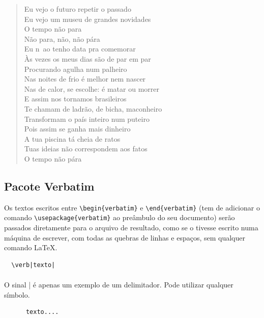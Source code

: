 \documentclass[a4paper,10pt]{report}
\newenvironment{myverbatim}
{\verbatim}
{\endverbatim}
\begin{document}
\begin{verse}
Eu vejo o futuro repetir o passado \\
Eu vejo um museu de grandes novidades \\
O tempo não para \\
Não para, não, não pára \\
Eu n~ao tenho data pra comemorar \\
Às vezes os meus dias são de par em par \\
Procurando agulha num palheiro \\
Nas noites de frio é melhor nem nascer \\
Nas de calor, se escolhe: é matar ou morrer \\
E assim nos tornamos brasileiros \\
Te chamam de ladrão, de bicha, maconheiro \\
Transformam o país inteiro num puteiro \\
Pois assim se ganha mais dinheiro \\
A tua piscina tá cheia de ratos \\
Tuas ideias não correspondem aos fatos \\
O tempo não pára \\
\end{verse}

\subsection{Pacote Verbatim}
Os textos escritos entre \verb|\begin{verbatim}| e \verb|\end{verbatim}| (tem de adicionar o comando \verb|\usepackage{verbatim}| ao preâmbulo do seu documento) serão passados diretamente para o arquivo de resultado, como se o tivesse escrito numa máquina de escrever, com todas as quebras de linhas e espaços, sem qualquer comando \LaTeX{}.
\begin{verbatim}
  \verb|texto|
\end{verbatim}

\paragraph{}
O sinal | é apenas um exemplo de um delimitador. Pode utilizar qualquer
símbolo.
\begin{myverbatim}
   \begin{verbatim}
      texto....
   \end{verbatim}
\end{myverbatim}
\end{document}
